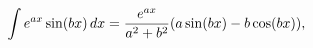 \[\int e^{ax}\mathop{\sin\/}\nolimits\!\left(bx\right)dx=\frac{e^{ax}}{a^{2}+b^{%
2}}(a\mathop{\sin\/}\nolimits\!\left(bx\right)-b\mathop{\cos\/}\nolimits\!%
\left(bx\right)),\]